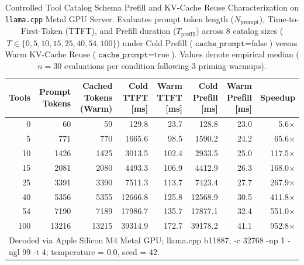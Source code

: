 \begin{table}[t]
\centering
\caption{Controlled Tool Catalog Schema Prefill and KV-Cache Reuse Characterization on \texttt{llama.cpp} Metal GPU Server. Evaluates prompt token length ($N_{\text{prompt}}$), Time-to-First-Token (TTFT), and Prefill duration ($T_{\text{prefill}}$) across 8 catalog sizes ($T \in \{0, 5, 10, 15, 25, 40, 54, 100\}$) under Cold Prefill ($\texttt{cache\_prompt} = \text{false}$) versus Warm KV-Cache Reuse ($\texttt{cache\_prompt} = \text{true}$). Values denote empirical median ($n=30$ evaluations per condition following 3 priming warmups).}
\label{tab:prefill_ablation}
\small
\begin{tabular}{r r r r r r r r}
\hline
\textbf{Tools} & \textbf{Prompt Tokens} & \textbf{Cached Tokens (Warm)} & \textbf{Cold TTFT [ms]} & \textbf{Warm TTFT [ms]} & \textbf{Cold Prefill [ms]} & \textbf{Warm Prefill [ms]} & \textbf{Speedup} \\
\hline
0 & 60 & 59 & 129.8 & 23.7 & 128.8 & 23.0 & 5.6$\times$ \\
5 & 771 & 770 & 1665.6 & 98.5 & 1590.2 & 24.2 & 65.6$\times$ \\
10 & 1426 & 1425 & 3013.5 & 102.4 & 2933.5 & 25.0 & 117.5$\times$ \\
15 & 2081 & 2080 & 4493.3 & 106.9 & 4412.9 & 26.3 & 168.0$\times$ \\
25 & 3391 & 3390 & 7511.3 & 113.7 & 7423.4 & 27.7 & 267.9$\times$ \\
40 & 5356 & 5355 & 12666.8 & 125.8 & 12568.9 & 30.5 & 411.8$\times$ \\
54 & 7190 & 7189 & 17986.7 & 135.7 & 17877.1 & 32.4 & 551.0$\times$ \\
100 & 13216 & 13215 & 39314.9 & 172.7 & 39178.2 & 41.1 & 952.8$\times$ \\
\hline
\multicolumn{8}{l}{\footnotesize Decoded via Apple Silicon M4 Metal GPU; llama.cpp b11887; -c 32768 -np 1 -ngl 99 -t 4; temperature = 0.0, seed = 42.} \\
\hline
\end{tabular}
\end{table}
